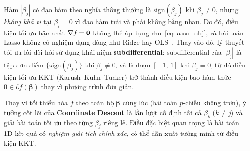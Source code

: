 Hàm $|\beta_j|$ có đạo hàm theo nghĩa thông thường là $\mathrm{sign}(\beta_j)$ khi
$\beta_j \neq 0$, nhưng \textit{không khả vi} tại $\beta_j = 0$ vì đạo hàm trái và
phải không bằng nhau. Do đó, điều kiện tối ưu bậc nhất $\nabla f = \mathbf{0}$ không thể
áp dụng cho~\eqref{eq:lasso_obj}, và bài toán Lasso không có nghiệm dạng đóng như Ridge
hay OLS~\cite{tibshirani1996}. Thay vào đó, lý thuyết tối ưu lồi đòi hỏi sử dụng khái
niệm \textbf{subdifferential}: subdifferential của $|\beta_j|$ là tập đơn điểm
$\{\mathrm{sign}(\beta_j)\}$ khi $\beta_j \neq 0$, và là đoạn $[-1,\,1]$ khi
$\beta_j = 0$, từ đó điều kiện tối ưu KKT (Karush--Kuhn--Tucker) trở thành điều kiện
bao hàm thức $0 \in \partial f(\boldsymbol{\beta})$ thay vì phương trình đơn giản.


Thay vì tối thiểu hóa $f$ theo toàn bộ $\boldsymbol{\beta}$ cùng lúc (bài toán $p$-chiều
không trơn), ý tưởng cốt lõi của \textbf{Coordinate Descent} là lần lượt cố định tất
cả $\beta_k$ ($k \neq j$) và giải bài toán tối ưu theo từng $\beta_j$ riêng lẻ. Điều
đặc biệt quan trọng là bài toán 1D kết quả có \textit{nghiệm giải tích chính xác}, có
thể dẫn xuất tường minh từ điều kiện KKT.

